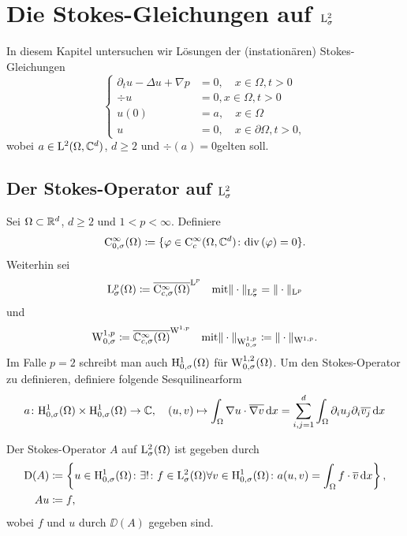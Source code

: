 \chapter{Die Stokes-Gleichungen auf \texorpdfstring{$\mathrm{L}_\sigma^2$}{L_sigma\textasciicircum 2}}

In diesem Kapitel untersuchen wir Lösungen der (instationären) Stokes-Gleichungen
$$
\begin{cases}
  \partial_t u - \Delta u + \nabla p &= 0, \quad x \in \Omega, t > 0 \\
  \div u &= 0, x \in \Omega, t > 0 \\
  u(0) &= a, \quad x \in \Omega \\
  u &= 0, \quad x \in \partial\Omega, t > 0,
\end{cases}
$$
wobei $a \in \mathrm{L}^2(\Omega, \mathbb{C}^d)$, $d \geq 2$ und \glqq$\div(a) = 0$\grqq gelten soll.


\section{Der Stokes-Operator auf \texorpdfstring{$\mathrm{L}_\sigma^2$}{L_sigma\textasciicircum 2}}

Sei $\Omega \subset \mathbb{R}^d$, $d \geq 2$ und $1 < p < \infty$.
Definiere
$$
\mathrm{C}_{0,\sigma}^\infty(\Omega) \coloneqq \{ \varphi \in \mathrm{C}_c^\infty(\Omega, \mathbb{C}^d) \colon \mathrm{div\,} (\varphi) =0 \}.
$$
Weiterhin sei
$$
\mathrm{L}^p_\sigma(\Omega) \coloneqq \overline{\mathrm{C}_{c,\sigma}^\infty(\Omega)}^{\mathrm{L}^p} \quad\text{mit} \|\cdot\|_{\mathrm{L}^p_\sigma} = \|\cdot\|_{\mathrm{L}^p}
$$
und
$$
\mathrm{W}_{0,\sigma}^{1,p} \coloneqq \overline{\mathbb{C}_{c,\sigma}^\infty(\Omega)}^{\mathrm{W}^{1,p}} \quad\text{mit} \|\cdot\|_{\mathrm{W}_{0,\sigma}^{1,p}} \coloneqq \|\cdot\|_{\mathrm{W}^{1,p}}.
$$
Im Falle $p= 2$ schreibt man auch $\mathrm{H}_{0,\sigma}^1(\Omega)$ für $\mathrm{W}_{0,\sigma}^{1,2}(\Omega)$.
Um den Stokes-Operator zu definieren, definiere folgende Sesquilinearform
$$
a \colon \mathrm{H}_{0,\sigma}^1(\Omega) \times \mathrm{H}_{0,\sigma}^1(\Omega) \to \mathbb{C}, \quad (u,v) \mapsto \int_\Omega \nabla u \cdot \overline{\nabla v} \, {\operatorname{d}\!{x}} = \sum_{i,j=1}^d \int_\Omega \partial_i u_j \partial_i \overline{v_j} \, {\operatorname{d}\!{x}}
$$

\begin{defn}
  Der Stokes-Operator $A$ auf $\mathrm{L}_\sigma^2(\Omega)$ ist gegeben durch
  \begin{align*}
  \mathrm{D}(A) &\coloneqq \left\{ u \in \mathrm{H}_{0,\sigma}^1(\Omega) \colon \exists! \colon f \in \mathrm{L}_\sigma^2(\Omega) \forall v \in \mathrm{H}_{0,\sigma}^1(\Omega) \colon a(u,v) = \int_\Omega f \cdot \overline v \, {\operatorname{d}\!{x}}\right\}, \\
  Au &\coloneqq f,
\end{align*}
wobei $f$ und $u$ durch $\DD(A)$ gegeben sind.
\end{defn}

